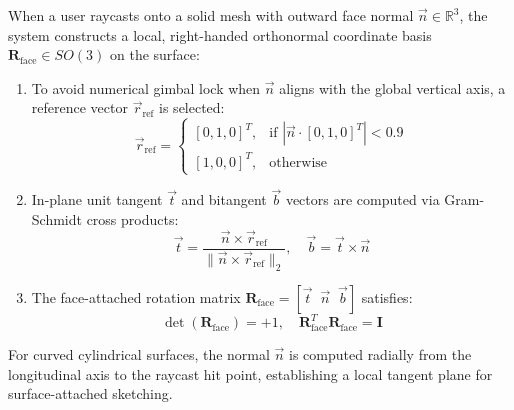 When a user raycasts onto a solid mesh with outward face normal $\vec{n} \in \mathbb{R}^3$, the system constructs a local, right-handed orthonormal coordinate basis $\mathbf{R}_{\text{face}} \in SO(3)$ on the surface:
\begin{enumerate}
    \item To avoid numerical gimbal lock when $\vec{n}$ aligns with the global vertical axis, a reference vector $\vec{r}_{\text{ref}}$ is selected:
    \begin{equation}
    \vec{r}_{\text{ref}} = \begin{cases}
    [0, 1, 0]^T, & \text{if } |\vec{n} \cdot [0, 1, 0]^T| < 0.9 \\
    [1, 0, 0]^T, & \text{otherwise}
    \end{cases}
    \label{eq:ref_vector}
    \end{equation}
    \item In-plane unit tangent $\vec{t}$ and bitangent $\vec{b}$ vectors are computed via Gram-Schmidt cross products:
    \begin{equation}
    \vec{t} = \frac{\vec{n} \times \vec{r}_{\text{ref}}}{\|\vec{n} \times \vec{r}_{\text{ref}}\|_2}, \quad \vec{b} = \vec{t} \times \vec{n}
    \label{eq:tangent_basis}
    \end{equation}
    \item The face-attached rotation matrix $\mathbf{R}_{\text{face}} = [\vec{t} \;\; \vec{n} \;\; \vec{b}]$ satisfies:
    \begin{equation}
    \det(\mathbf{R}_{\text{face}}) = +1, \quad \mathbf{R}_{\text{face}}^T \mathbf{R}_{\text{face}} = \mathbf{I}
    \label{eq:so3_property}
    \end{equation}
\end{enumerate}
For curved cylindrical surfaces, the normal $\vec{n}$ is computed radially from the longitudinal axis to the raycast hit point, establishing a local tangent plane for surface-attached sketching.

